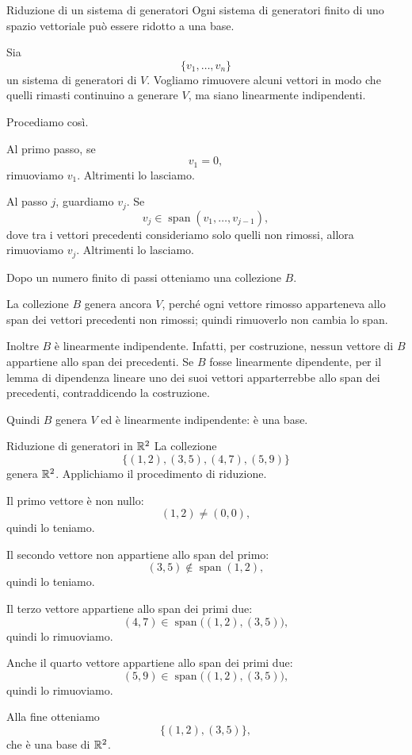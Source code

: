 \documentclass[a4paper]{article}
\begin{document}
\begin{snippetproposition}{Riduzione di un sistema di generatori}
    Ogni sistema di generatori finito di uno spazio vettoriale può essere ridotto a una base.
\end{snippetproposition}

\begin{snippetproof}{}
    Sia
    \[
        \{v_1,\ldots,v_n\}
    \]
    un sistema di generatori di \(V\). Vogliamo rimuovere alcuni vettori in modo che quelli rimasti continuino a generare \(V\), ma siano linearmente indipendenti.

    Procediamo così.

    Al primo passo, se
    \[
        v_1=0,
    \]
    rimuoviamo \(v_1\). Altrimenti lo lasciamo.

    Al passo \(j\), guardiamo \(v_j\). Se
    \[
        v_j\in\operatorname{span}(v_1,\ldots,v_{j-1}),
    \]
    dove tra i vettori precedenti consideriamo solo quelli non rimossi, allora rimuoviamo \(v_j\). Altrimenti lo lasciamo.

    Dopo un numero finito di passi otteniamo una collezione \(B\).

    La collezione \(B\) genera ancora \(V\), perché ogni vettore rimosso apparteneva allo span dei vettori precedenti non rimossi; quindi rimuoverlo non cambia lo span.

    Inoltre \(B\) è linearmente indipendente. Infatti, per costruzione, nessun vettore di \(B\) appartiene allo span dei precedenti. Se \(B\) fosse linearmente dipendente, per il lemma di dipendenza lineare uno dei suoi vettori apparterrebbe allo span dei precedenti, contraddicendo la costruzione.

    Quindi \(B\) genera \(V\) ed è linearmente indipendente: è una base.
\end{snippetproof}

\begin{snippetexample}{Riduzione di generatori in \(\mathbb{R}^2\)}
    La collezione
    \[
        \{(1,2),(3,5),(4,7),(5,9)\}
    \]
    genera \(\mathbb{R}^2\). Applichiamo il procedimento di riduzione.

    Il primo vettore è non nullo:
    \[
        (1,2)\neq(0,0),
    \]
    quindi lo teniamo.

    Il secondo vettore non appartiene allo span del primo:
    \[
        (3,5)\notin\operatorname{span}(1,2),
    \]
    quindi lo teniamo.

    Il terzo vettore appartiene allo span dei primi due:
    \[
        (4,7)\in\operatorname{span}\bigl((1,2),(3,5)\bigr),
    \]
    quindi lo rimuoviamo.

    Anche il quarto vettore appartiene allo span dei primi due:
    \[
        (5,9)\in\operatorname{span}\bigl((1,2),(3,5)\bigr),
    \]
    quindi lo rimuoviamo.

    Alla fine otteniamo
    \[
        \{(1,2),(3,5)\},
    \]
    che è una base di \(\mathbb{R}^2\).
\end{snippetexample}
\end{document}
